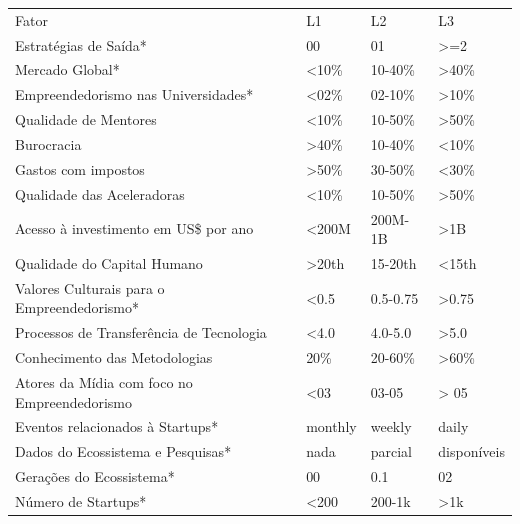 \begin{table}[!htb]
\centering
\begin{tabular}{llll}
Fator                                                      &     L1     &     L2     &     L3      \\
Estratégias de Saída*                                      &     00     &     01     &    >=2      \\
Mercado Global*                                            &    <10\%   &   10-40\%  &    >40\%    \\
Empreendedorismo nas Universidades*                        &    <02\%   &   02-10\%  &    >10\%    \\
Qualidade de Mentores                                      &    <10\%   &   10-50\%  &    >50\%    \\
Burocracia                                                 &    >40\%   &   10-40\%  &    <10\%    \\
Gastos com impostos                                        &    >50\%   &   30-50\%  &    <30\%    \\
Qualidade das Aceleradoras                                 &    <10\%   &   10-50\%  &    >50\%    \\
Acesso à investimento em US\$ por ano                      &    <200M   &   200M-1B  &    >1B      \\
Qualidade do Capital Humano                                &    >20th   &   15-20th  &    <15th    \\
Valores Culturais para o Empreendedorismo*                 &    <0.5    &   0.5-0.75 &    >0.75    \\
Processos de Transferência de Tecnologia                   &    <4.0    &   4.0-5.0  &    >5.0     \\
Conhecimento das Metodologias                              &    20\%    &   20-60\%  &    >60\%    \\
Atores da Mídia com foco no Empreendedorismo               &    <03     &   03-05    &    > 05     \\
Eventos relacionados à Startups*                           &   monthly  &   weekly   &    daily    \\
Dados do Ecossistema e Pesquisas*                          &    nada    & parcial    & disponíveis \\
Gerações do Ecossistema*                                   &     00     &    0.1     &    02       \\
Número de Startups*                                        &    <200    &   200-1k   &    >1k      \\

\end{tabular}
\end{table}
